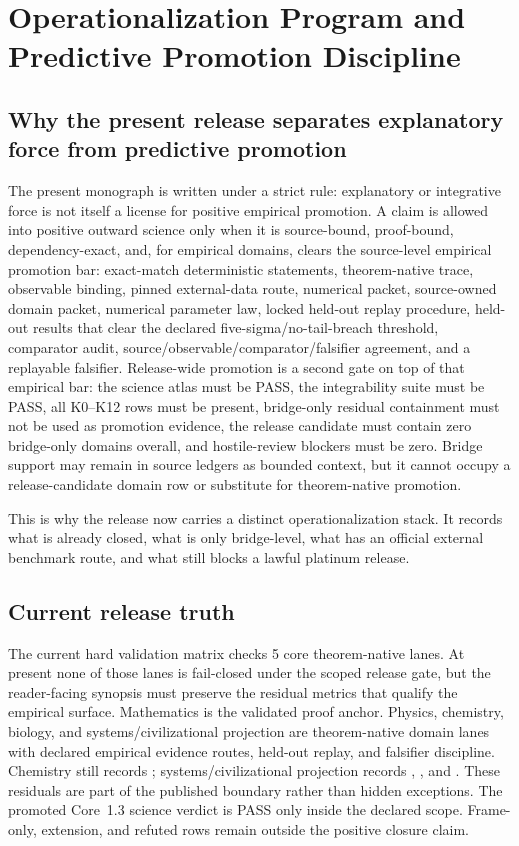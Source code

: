 \section{Operationalization Program and Predictive Promotion Discipline}
\label{sec:oc-core-1-3-operationalization-program}

\subsection{Why the present release separates explanatory force from predictive promotion}
\label{sec:oc13-prediction-claim-taxonomy-v3}
The present monograph is written under a strict rule: explanatory or integrative force is not itself a license for positive empirical promotion.
A claim is allowed into positive outward science only when it is source-bound,
proof-bound, dependency-exact, and, for empirical domains, clears the
source-level empirical promotion bar: exact-match deterministic statements,
theorem-native trace, observable binding, pinned external-data route, numerical
packet, source-owned domain packet, numerical parameter law, locked held-out
replay procedure, held-out results that clear the declared
five-sigma/no-tail-breach threshold, comparator audit,
source/observable/comparator/falsifier agreement, and a replayable falsifier.
Release-wide promotion is a second gate on top of
that empirical bar: the science atlas must be PASS, the integrability suite must
be PASS, all K0--K12 rows must be present, bridge-only residual containment must
not be used as promotion evidence, the release candidate must contain zero
bridge-only domains overall, and hostile-review blockers must be zero. Bridge
support may remain in source ledgers as bounded context, but it cannot occupy a
release-candidate domain row or substitute for theorem-native promotion.

This is why the release now carries a distinct operationalization stack. It records what is already closed, what is only bridge-level, what has an official external benchmark route, and what still blocks a lawful platinum release.

\subsection{Current release truth}
The current hard validation matrix checks 5 core theorem-native lanes. At
present none of those lanes is fail-closed under the scoped release gate, but
the reader-facing synopsis must preserve the residual metrics that qualify the
empirical surface. Mathematics is the validated proof anchor. Physics,
chemistry, biology, and systems/civilizational projection are theorem-native
domain lanes with declared empirical evidence routes, held-out replay, and
falsifier discipline. Chemistry still records
; systems/civilizational projection records
, , and
. These residuals are part of the
published boundary rather than hidden exceptions. The promoted Core~1.3 science
verdict is PASS only inside the declared 
scope. Frame-only, extension, and refuted rows remain outside the positive
closure claim.

